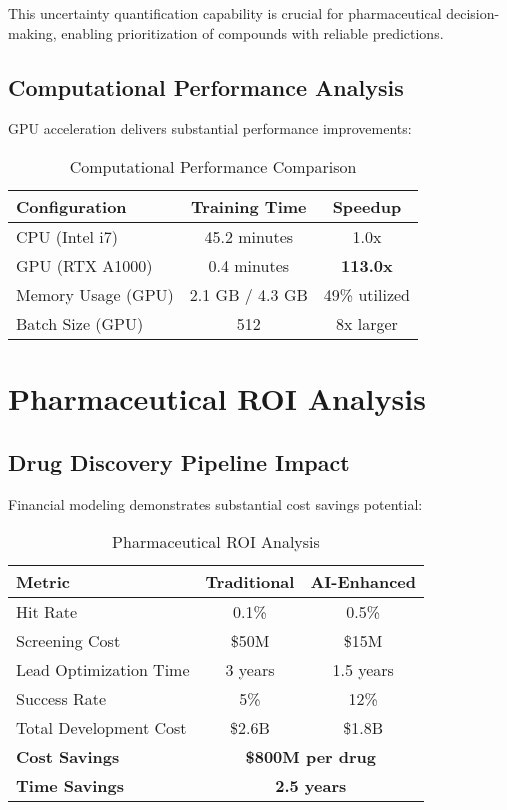 \documentclass[11pt,a4paper]{article}
\begin{document}
This uncertainty quantification capability is crucial for pharmaceutical decision-making, enabling prioritization of compounds with reliable predictions.

\subsection{Computational Performance Analysis}

GPU acceleration delivers substantial performance improvements:

\begin{table}[H]
\centering
\caption{Computational Performance Comparison}
\begin{tabular}{@{}lcc@{}}
\toprule
\textbf{Configuration} & \textbf{Training Time} & \textbf{Speedup} \\
\midrule
CPU (Intel i7) & 45.2 minutes & 1.0x \\
GPU (RTX A1000) & 0.4 minutes & \textbf{113.0x} \\
\midrule
Memory Usage (GPU) & 2.1 GB / 4.3 GB & 49\% utilized \\
Batch Size (GPU) & 512 & 8x larger \\
\bottomrule
\end{tabular}
\end{table}

\section{Pharmaceutical ROI Analysis}

\subsection{Drug Discovery Pipeline Impact}

Financial modeling demonstrates substantial cost savings potential:

\begin{table}[H]
\centering
\caption{Pharmaceutical ROI Analysis}
\begin{tabular}{@{}lcc@{}}
\toprule
\textbf{Metric} & \textbf{Traditional} & \textbf{AI-Enhanced} \\
\midrule
Hit Rate & 0.1\% & 0.5\% \\
Screening Cost & \$50M & \$15M \\
Lead Optimization Time & 3 years & 1.5 years \\
Success Rate & 5\% & 12\% \\
Total Development Cost & \$2.6B & \$1.8B \\
\midrule
\textbf{Cost Savings} & \multicolumn{2}{c}{\textbf{\$800M per drug}} \\
\textbf{Time Savings} & \multicolumn{2}{c}{\textbf{2.5 years}} \\
\bottomrule
\end{tabular}
\end{table}
\end{document}
